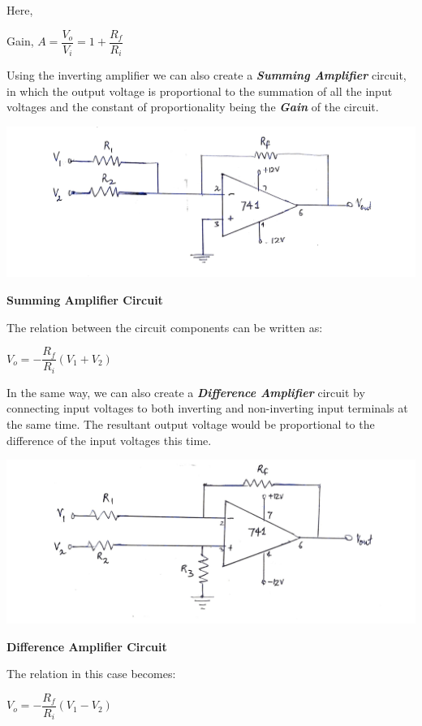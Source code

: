 \clearpage
\noindent Here, 
\begin{center}
    Gain, $A = \dfrac{V_o}{V_{i}} = 1 + \dfrac{R_f}{R_i}$
\end{center}
Using the inverting amplifier we can also create a \textbf{\emph{Summing Amplifier}} circuit, in which the output voltage is proportional to the summation of all the input voltages and the constant of proportionality being the \textbf{\emph{Gain}} of the circuit.
\begin{center}
    \includegraphics[scale = 0.2]{OPAMP Config/summing.jpg}
\end{center}
\begin{center}
    \textbf{Summing Amplifier Circuit}
\end{center}
\noindent The relation between the circuit components can be written as: 
\begin{center}
    $V_o = - \dfrac{R_f}{R_i}(V_1 + V_2)$
\end{center}
In the same way, we can also create a \textbf{\emph{Difference Amplifier}} circuit by connecting input voltages to both inverting and non-inverting input terminals at the same time. The resultant output voltage would be proportional to the difference of the input voltages this time.
\begin{center}
    \includegraphics[scale = 0.18]{OPAMP Config/difference.jpg}
\end{center}
\begin{center}
    \textbf{Difference Amplifier Circuit}
\end{center}
\noindent The relation in this case becomes:
\begin{center}
    $V_o = - \dfrac{R_f}{R_i}(V_1 - V_2)$
\end{center}

